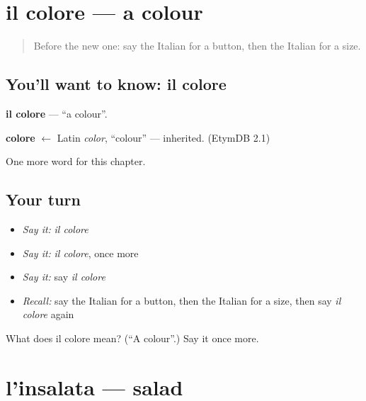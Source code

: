\section[il colore]{il colore — a colour}

\label{lesson:IT-C247-colore}



\begin{quote}
Before the new one: say the Italian for a button, then the Italian for a size.
\end{quote}

\subsection*{You'll want to know: il colore}
\textbf{il colore} — \textquotedblleft{}a colour\textquotedblright{}.

\begin{cousinweb}
\textbf{colore} $\leftarrow$ Latin \emph{color}, \textquotedblleft{}colour\textquotedblright{} — inherited. (EtymDB 2.1)
\end{cousinweb}

\begin{grammarlens}[title={What you've built}]
One more word for this chapter.
\end{grammarlens}

\subsection*{Your turn}
\begin{itemize}
\raggedright
  \item \emph{Say it:} \emph{il colore}
  \item \emph{Say it:} \emph{il colore}, once more
  \item \emph{Say it:} say \emph{il colore}
  \item \emph{Recall:} say the Italian for a button, then the Italian for a size, then say \emph{il colore} again
\end{itemize}

\begin{tcolorbox}[breakable,colback=teal!4,colframe=teal!35!black,title={Before you move on}]
What does il colore mean? (\textquotedblleft{}A colour\textquotedblright{}.) Say it once more.
\end{tcolorbox}
\section[l'insalata]{l'insalata — salad}

